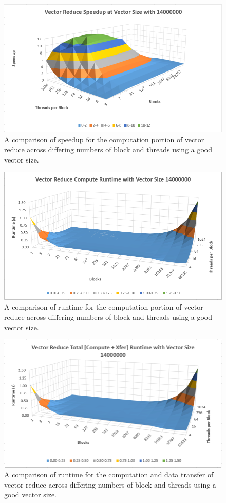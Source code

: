\documentclass{article}
\begin{document}
  \begin{figure}[h]
    \centering
    \includegraphics[width=.9\linewidth]{speedup_surface}
    \caption{A comparison of speedup for the computation portion of vector reduce across differing numbers of block and threads using a good vector size.}
    \label{fig:compute_speedup_surface}
  \end{figure}

  \begin{figure}[h]
    \centering
    \includegraphics[width=.9\linewidth]{compute_runtime_surface}
    \caption{A comparison of runtime for the computation portion of vector reduce across differing numbers of block and threads using a good vector size.}
    \label{fig:compute_runtime_surface}
  \end{figure}

  \begin{figure}[h]
    \centering
    \includegraphics[width=.9\linewidth]{total_runtime_surface}
    \caption{A comparison of runtime for the computation and data transfer of vector reduce across differing numbers of block and threads using a good vector size.}
    \label{fig:total_runtime_surface}
  \end{figure}
\end{document}
